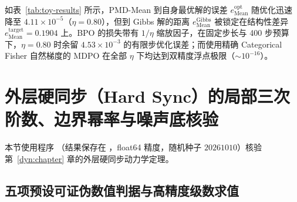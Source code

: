 \documentclass[lang=cn,scheme=chinese,openany]{elegantbook}
\begin{document}
如表~\ref{tab:toy-results} 所示，PMD-Mean 到自身最优解的误差 $e^{\mathrm{opt}}_{\mathrm{Mean}}$ 随优化迅速降至 $4.11\times 10^{-5}$（$\eta=0.80$），但到 Gibbs 解的距离 $e^{\mathrm{Gibbs}}_{\mathrm{Mean}}$ 被锁定在结构性差异 $e^{\mathrm{target}}_{\mathrm{Mean}}=0.1904$ 上。BPO 的损失带有 $1/\eta$ 缩放因子，在固定步长与 400 步预算下，$\eta=0.80$ 时余留 $4.53\times 10^{-3}$ 的有限步优化误差；而使用精确 Categorical Fisher 自然梯度的 MDPO 在全部 $\eta$ 下均达到双精度浮点极限（$\sim 10^{-16}$）。

\section{外层硬同步（Hard Sync）的局部三次阶数、边界幂率与噪声底核验}
\label{dyn:sec:hard-sync-experiments}

本节使用程序 （结果保存在 ，float64 精度，随机种子 $20261010$）核验第~\ref{dyn:chapter} 章的外层硬同步动力学定理。

\subsection{五项预设可证伪数值判据与高精度级数求值}
\end{document}

